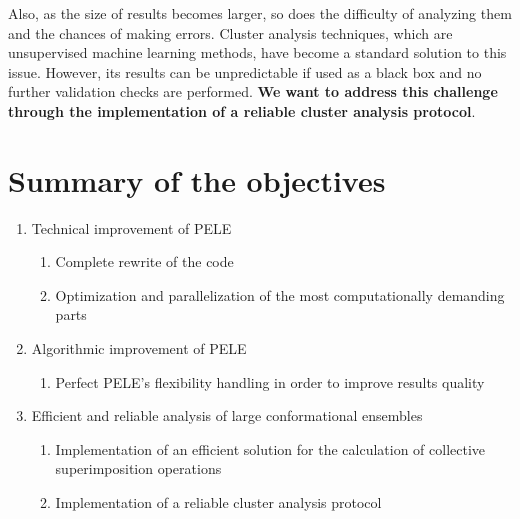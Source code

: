 Also, as the size of results becomes larger, so does the difficulty of analyzing them and the chances of making
errors. Cluster analysis techniques, which are unsupervised machine learning methods, have become a standard solution to this
issue. However, its results can be unpredictable if used as a black box and no further validation checks are performed.
\textbf{We want to address this challenge through the implementation of a reliable cluster analysis protocol}.


\section{Summary of the objectives}

\begin{enumerate}
	\item Technical improvement of PELE
		\begin{enumerate}
			\item Complete rewrite of the code 
			\item Optimization and parallelization of the most computationally demanding parts 
		\end{enumerate}

    \item Algorithmic improvement of PELE
		\begin{enumerate}
			\item Perfect PELE's flexibility handling in order to improve results quality 
		\end{enumerate}	

    \item Efficient and reliable analysis of large conformational ensembles 
		\begin{enumerate}
			\item Implementation of an efficient solution for the calculation of collective superimposition operations 
			\item Implementation of a reliable cluster analysis protocol
		\end{enumerate}
	
\end{enumerate}




